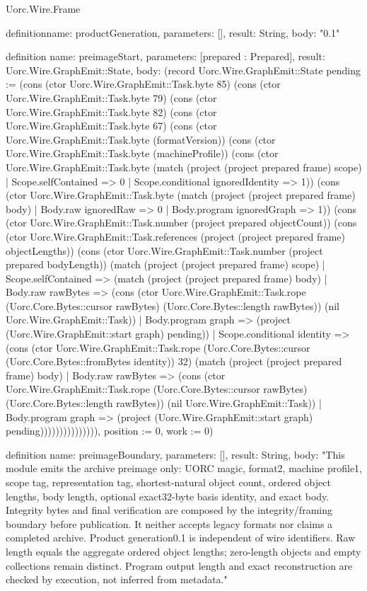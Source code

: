 \begin{lexlean}{Uorc.Wire.Frame}
\begin{semanticmodule}
definition{name: productGeneration, parameters: [], result: String, body: "0.1"}

definition{
  name: preimageStart,
  parameters: [prepared : Prepared],
  result: Uorc.Wire.GraphEmit::State,
  body: (record Uorc.Wire.GraphEmit::State {pending := (cons (ctor Uorc.Wire.GraphEmit::Task.byte 85) (cons (ctor Uorc.Wire.GraphEmit::Task.byte 79) (cons (ctor Uorc.Wire.GraphEmit::Task.byte 82) (cons (ctor Uorc.Wire.GraphEmit::Task.byte 67) (cons (ctor Uorc.Wire.GraphEmit::Task.byte (formatVersion)) (cons (ctor Uorc.Wire.GraphEmit::Task.byte (machineProfile)) (cons (ctor Uorc.Wire.GraphEmit::Task.byte (match (project (project prepared frame) scope)
    | Scope.selfContained => 0
    | Scope.conditional ignoredIdentity => 1)) (cons (ctor Uorc.Wire.GraphEmit::Task.byte (match (project (project prepared frame) body)
    | Body.raw ignoredRaw => 0
    | Body.program ignoredGraph => 1)) (cons (ctor Uorc.Wire.GraphEmit::Task.number (project prepared objectCount)) (cons (ctor Uorc.Wire.GraphEmit::Task.references (project (project prepared frame) objectLengths)) (cons (ctor Uorc.Wire.GraphEmit::Task.number (project prepared bodyLength)) (match (project (project prepared frame) scope)
    | Scope.selfContained => (match (project (project prepared frame) body)
      | Body.raw rawBytes => (cons (ctor Uorc.Wire.GraphEmit::Task.rope (Uorc.Core.Bytes::cursor rawBytes) (Uorc.Core.Bytes::length rawBytes)) (nil Uorc.Wire.GraphEmit::Task))
      | Body.program graph => (project (Uorc.Wire.GraphEmit::start graph) pending))
    | Scope.conditional identity => (cons (ctor Uorc.Wire.GraphEmit::Task.rope (Uorc.Core.Bytes::cursor (Uorc.Core.Bytes::fromBytes identity)) 32) (match (project (project prepared frame) body)
      | Body.raw rawBytes => (cons (ctor Uorc.Wire.GraphEmit::Task.rope (Uorc.Core.Bytes::cursor rawBytes) (Uorc.Core.Bytes::length rawBytes)) (nil Uorc.Wire.GraphEmit::Task))
      | Body.program graph => (project (Uorc.Wire.GraphEmit::start graph) pending))))))))))))))), position := 0, work := 0})
}

definition{
  name: preimageBoundary,
  parameters: [],
  result: String,
  body: "This module emits the archive preimage only: UORC magic, format2, machine profile1, scope tag, representation tag, shortest-natural object count, ordered object lengths, body length, optional exact32-byte basis identity, and exact body. Integrity bytes and final verification are composed by the integrity/framing boundary before publication. It neither accepts legacy formats nor claims a completed archive. Product generation0.1 is independent of wire identifiers. Raw length equals the aggregate ordered object lengths; zero-length objects and empty collections remain distinct. Program output length and exact reconstruction are checked by execution, not inferred from metadata."
}


\end{semanticmodule}
\end{lexlean}
